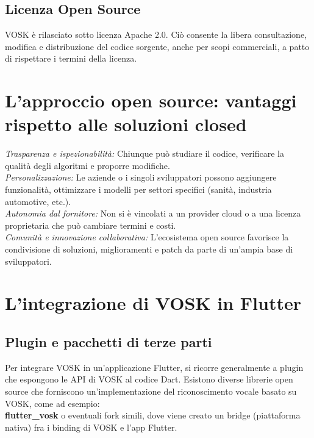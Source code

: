 \documentclass[14pt]{extbook}
\begin{document}
\subsection{Licenza Open Source}
VOSK è rilasciato sotto licenza Apache 2.0. Ciò consente la libera consultazione, modifica e distribuzione del codice sorgente, anche per scopi commerciali, a patto di rispettare i termini della licenza.\\

\section{L’approccio open source: vantaggi rispetto alle soluzioni closed}
\textit{Trasparenza e ispezionabilità:} Chiunque può studiare il codice, verificare la qualità degli algoritmi e proporre modifiche.\\

\textit{Personalizzazione:} Le aziende o i singoli sviluppatori possono aggiungere funzionalità, ottimizzare i modelli per settori specifici (sanità, industria automotive, etc.).\\

\textit{Autonomia dal fornitore:} Non si è vincolati a un provider cloud o a una licenza proprietaria che può cambiare termini e costi.\\

\textit{Comunità e innovazione collaborativa:} L’ecosistema open source favorisce la condivisione di soluzioni, miglioramenti e patch da parte di un’ampia base di sviluppatori.\\

\section{L’integrazione di VOSK in Flutter}
\subsection{Plugin e pacchetti di terze parti}
Per integrare VOSK in un’applicazione Flutter, si ricorre generalmente a plugin che espongono le API di VOSK al codice Dart. Esistono diverse librerie open source che forniscono un’implementazione del riconoscimento vocale basato su VOSK, come ad esempio:\\

\textbf{flutter\_vosk} o eventuali fork simili, dove viene creato un bridge (piattaforma nativa) fra i binding di VOSK e l’app Flutter.\\
\end{document}
